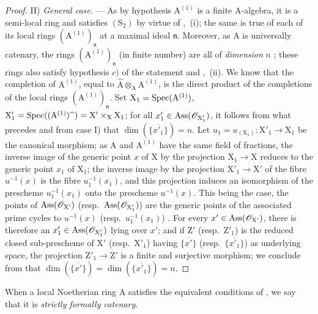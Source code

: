 \begin{proof}
\medskip\noindent
II) \emph{General case.} ---
As by hypothesis $\mathrm{A}^{(1)}$ is a finite A-algebra, it is a semi-local ring and satisfies $(\mathrm{S}_2)$ by virtue of ,~(i); the same is true of each of its local rings $({\mathrm{A}^{(1)}})_\mathfrak{n}$ at a maximal ideal $\mathfrak{n}$.
Moreover, as $\mathrm{A}$ is universally catenary, the rings $({\mathrm{A}^{(1)}})_\mathfrak{n}$ (in finite number) are all of \emph{dimension} $n$ ; these rings also satisfy hypothesis $c)$ of the statement  and ,~(ii).
We know that the completion of $\mathrm{A}^{(1)}$, equal to $\widehat{\mathrm{A}}\otimes_\mathrm{A}\mathrm{A}^{(1)}$, is the direct product of the completions of the local rings $(\mathrm{A}^{(1)})_\mathfrak{n}$.
Set $\mathrm{X}_1=\operatorname{Spec}(\mathrm{A}^{(1)})$, $\mathrm{X}'_1=\operatorname{Spec}((\mathrm{A}^{(1)})\widehat{\phantom{x}})=\mathrm{X}'\times_\mathrm{X}\mathrm{X}_1$; for all $x'_1\in\operatorname{Ass}(\mathscr{O}_{\mathrm{X}'_1})$, it follows from what precedes and from case I) that $\dim(\overline{\{x'_1\}})=n$.
Let $u_1=u_{(\mathrm{X}_1)}:\mathrm{X}'_1\to\mathrm{X}_1$ be the canonical morphism; as $\mathrm{A}$ and $\mathrm{A}^{(1)}$ have the same field of fractions, the inverse image of the generic point $x$ of $\mathrm{X}$ by the projection $\mathrm{X}_1\to\mathrm{X}$ reduces to the generic point $x_1$ of $\mathrm{X}_1$; the inverse image by the projection $\mathrm{X}'_1\to\mathrm{X}'$ of the fibre $u^{-1}(x)$ is the fibre $u_1^{-1}(x_1)$, and this projection induces an isomorphism of the prescheme $u_1^{-1}(x_1)$ onto the prescheme $u^{-1}(x)$.
This being the case, the points of $\operatorname{Ass}(\mathscr{O}_{\mathrm{X}'})$ (resp.~$\operatorname{Ass}(\mathscr{O}_{\mathrm{X}'_1})$) are the generic points of the associated prime cycles to $u^{-1}(x)$ (resp.~$u_1^{-1}(x_1)$) .
For every $x'\in\operatorname{Ass}(\mathscr{O}_{\mathrm{X}'})$, there is therefore an $x'_1\in\operatorname{Ass}(\mathscr{O}_{\mathrm{X}'_1})$ lying over $x'$; and if $\mathrm{Z}'$ (resp.~$\mathrm{Z}'_1$) is the reduced closed sub-prescheme of $\mathrm{X}'$ (resp.~$\mathrm{X}'_1$) having $\overline{\{x'\}}$ (resp.~$\overline{\{x'_1\}}$) as underlying space, the projection $\mathrm{Z}'_1\to\mathrm{Z}'$ is a finite and surjective morphism; we conclude from  that $\dim(\overline{\{x'\}})=\dim(\overline{\{x'_1\}})=n$.
\end{proof}

\begin{definition}[7.2.6]
\label{IV.7.2.6}
When a local Noetherian ring $\mathrm{A}$ satisfies the equivalent conditions of , we say that it is \emph{strictly formally catenary}.
\end{definition}

